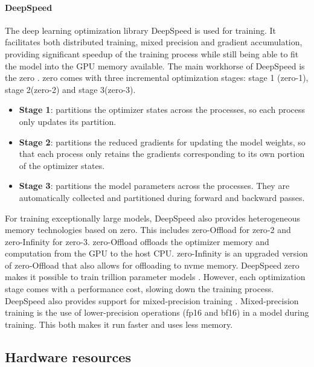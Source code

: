 \paragraph{DeepSpeed}
\label{par:deepspeed}
The deep learning optimization library DeepSpeed \cite{deepspeed} is used for training. It facilitates both distributed training, mixed precision and gradient accumulation, providing significant speedup of the training process while still being able to fit the model into the GPU memory available. The main workhorse of DeepSpeed is the \acrfull{zero} \cite{zero}. \acrshort{zero} comes with three incremental optimization stages: stage 1 (\acrshort{zero}-1), stage 2(\acrshort{zero}-2) and stage 3(\acrshort{zero}-3).

\begin{itemize}
    \item \textbf{Stage 1}: partitions the optimizer states across the processes, so each process only updates its partition.
    \item \textbf{Stage 2}: partitions the reduced gradients for updating the model weights, so that each process only retains the gradients corresponding to its own portion of the optimizer states.
    \item \textbf{Stage 3}: partitions the model parameters across the processes. They are automatically collected and partitioned during forward and backward passes.
\end{itemize}

\noindent
For training exceptionally large models, DeepSpeed also provides heterogeneous memory technologies based on \acrshort{zero}. This includes \acrshort{zero}-Offload for \acrshort{zero}-2 and \acrshort{zero}-Infinity \cite{zeroinfinity} for \acrshort{zero}-3. \acrshort{zero}-Offload offloads the optimizer memory and computation from the GPU to the host CPU. \acrshort{zero}-Infinity is an upgraded version of \acrshort{zero}-Offload that also allows for offloading to \gls{nvme} memory. DeepSpeed \acrshort{zero} makes it possible to train trillion parameter models \cite{zeroinfinity}. However, each optimization stage comes with a performance cost, slowing down the training process. DeepSpeed also provides support for mixed-precision training \cite{mixedprecision}. Mixed-precision training is the use of lower-precision operations (\acrshort{fp16} and \acrshort{bf16}) in a model during training. This both makes it run faster and uses less memory.

\subsection{Hardware resources}
\label{sec:hardware-resources}

